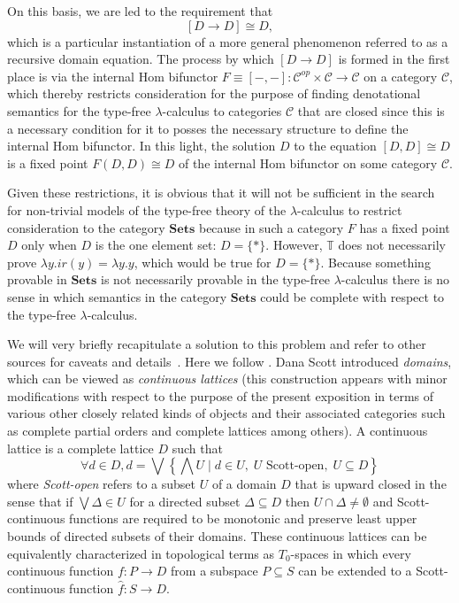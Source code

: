 \documentclass[10pt]{article}
\theoremstyle{plain}
\theoremstyle{definition}
\theoremstyle{remark}
\begin{document}
On this basis, we are led to the requirement that
$$
[D \rightarrow D] \cong D,
$$
which is a particular instantiation of a more general phenomenon referred to as a recursive domain equation. The process by which $[D \rightarrow D]$ is formed in the first place is via the internal Hom bifunctor $F \equiv [-,-] \colon \mathcal{C}^{op} \times \mathcal{C} \rightarrow \mathcal{C}$ on a category $\mathcal{C}$, which thereby restricts consideration for the purpose of finding denotational semantics for the type-free $\lambda$-calculus to categories $\mathcal{C}$ that are closed since this is a necessary condition for it to posses the necessary structure to define the internal Hom bifunctor. In this light, the solution $D$ to the equation $[D,D] \cong D$ is a fixed point $F(D,D) \cong D$ of the internal Hom bifunctor on some category $\mathcal{C}$.

Given these restrictions, it is obvious that it will not be sufficient in the search for non-trivial models of the type-free theory of the $\lambda$-calculus to restrict consideration to the category $\mathbf{Sets}$ because in such a category $F$ has a fixed point $D$ only when $D$ is the one element set: $D = \{*\}$. However, $\mathbb{T}$ does not necessarily prove $\lambda y.ir(y)=\lambda y.y$, which would be true for $D = \{*\}$. Because something provable in $\mathbf{Sets}$ is not necessarily provable in the type-free $\lambda$-calculus there is no sense in which semantics in the category $\mathbf{Sets}$ could be complete with respect to the type-free $\lambda$-calculus.

We will very briefly recapitulate a solution to this problem and refer to other sources for caveats and details~\cite{Barendregt1985,Smyth1982,Freyd1990,Abramsky1995,Cattani2007}. Here we follow \cite{Hindley2006}. Dana Scott introduced \emph{domains}, which can be viewed as \emph{continuous lattices} (this construction appears with minor modifications with respect to the purpose of the present exposition in terms of various other closely related kinds of objects and their associated categories such as complete partial orders and complete lattices among others). A continuous lattice is a complete lattice $D$ such that
$$
\forall d \in D, d = \bigvee \left\{ \bigwedge U \mid d \in U,\; U \mbox{ Scott-open},\; U \subseteq D \right\}
$$
where \emph{Scott-open} refers to a subset $U$ of a domain $D$ that is upward closed in the sense that if $\bigvee \Delta \in U$ for a directed subset $\Delta \subseteq D$ then $U \cap \Delta \neq \emptyset$ and Scott-continuous functions are required to be monotonic and preserve least upper bounds of directed subsets of their domains. These continuous lattices can be equivalently characterized in topological terms as $T_0$-spaces in which every continuous function $f \colon P \rightarrow D$ from a subspace $P \subseteq S$ can be extended to a Scott-continuous function $\hat{f} \colon S \rightarrow D$.
\end{document}
